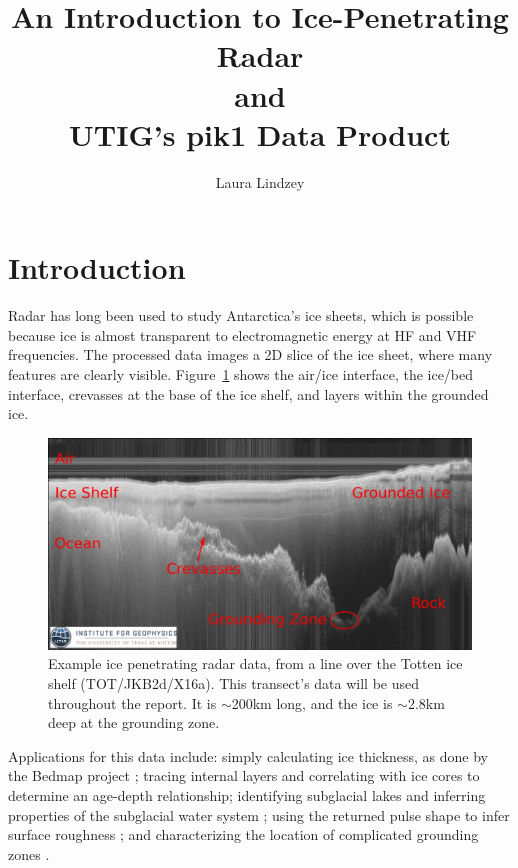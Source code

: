 \documentclass[11pt]{article}
\newcommand{\figref}[1]{Figure~\ref{#1}}
\begin{document}

\title{An Introduction to Ice-Penetrating Radar \\ and \\UTIG's \textbf{pik1} Data Product}
\author{Laura Lindzey}
\maketitle

\section{Introduction}

Radar has long been used to study Antarctica's ice sheets, which is possible because ice is almost transparent to electromagnetic energy at HF and VHF frequencies. 
The processed data images a 2D slice of the ice sheet, where many features are clearly visible. 
\figref{fig:example_data} shows the air/ice interface, the ice/bed interface, crevasses at the base of the ice shelf, and layers within the grounded ice. 

\begin{figure}[ht!]
\centering
\includegraphics[width=1.0\columnwidth]{figures/TOT_JKB2d_X16a_full_small.jpg}
\caption[]{Example ice penetrating radar data, from a line over the Totten ice shelf (TOT/JKB2d/X16a). This transect's data will be used throughout the report. It is $\sim$200km long, and the ice is $\sim$2.8km deep at the grounding zone.}
\label{fig:example_data}
\end{figure}

Applications for this data include: simply calculating ice thickness, as done by the Bedmap project \cite{Fretwell2013}; tracing internal layers \cite{MacGregor2015, Holschuh2014a} and correlating with ice cores to determine an age-depth relationship; identifying subglacial lakes \cite{Carter2009} and inferring properties of the subglacial water system \cite{Schroeder2013, Schroeder2014, Schroeder2014b, Schroeder2015}; using the returned pulse shape to infer surface roughness \cite{Grima2012, Grima2014}; and characterizing the location of complicated grounding zones \cite{Greenbaum2015}. 
\end{document}
